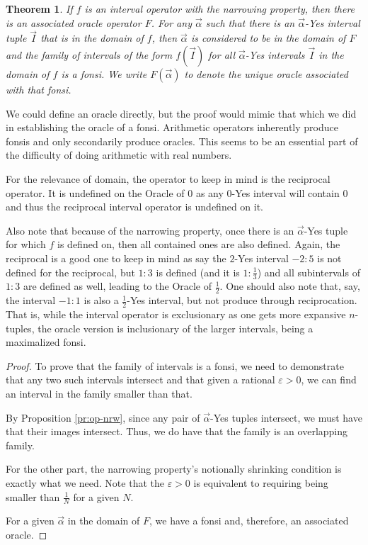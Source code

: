 \documentclass[12pt]{article}
\newtheorem{theorem}{Theorem}[subsection]
\begin{document}
\begin{theorem}\label{th:intop}
If $f$ is an interval operator with the narrowing property, then there is an associated oracle operator $F$. For any $\vec{\alpha}$ such that there is an $\vec{\alpha}$-Yes interval tuple $\vec{I}$ that is in the domain of 
$f$, then $\vec{\alpha}$ is considered to be in the domain of $F$ and the family of intervals of the form $f(\vec{I})$ for all $\vec{\alpha}$-Yes intervals $\vec{I}$ in the domain of $f$ is a fonsi. We write $F(\vec{\alpha})$ to denote the unique oracle associated with that fonsi. 
\end{theorem}

We could define an oracle directly, but the proof would mimic that which we did in establishing the oracle of a fonsi. Arithmetic operators inherently produce fonsis and only secondarily produce oracles. This seems to be an essential part of the difficulty of doing arithmetic with real numbers. 

For the relevance of domain, the operator to keep in mind is the reciprocal operator. It is undefined on the Oracle of 0 as any 0-Yes interval will contain 0 and thus the reciprocal interval operator is undefined on it. 

Also note that because of the narrowing property, once there is an $\vec{\alpha}$-Yes tuple for which $f$ is defined on, then all contained ones are also defined. Again, the reciprocal is a good one to keep in mind as say the $2$-Yes interval $-2:5$ is not defined for the reciprocal, but $1:3$ is defined (and it is $1:\frac{1}{3}$) and all subintervals of $1:3$ are defined as well, leading to the Oracle of $\frac{1}{2}$. One should also note that, say, the interval $-1:1$ is also a $\frac{1}{2}$-Yes interval, but not produce through reciprocation. That is, while the interval operator is exclusionary as one gets more expansive $n$-tuples, the oracle version is inclusionary of the larger intervals, being a maximalized fonsi. 

\begin{proof}
To prove that the family of intervals is a fonsi, we need to demonstrate that any two such intervals intersect and that given a rational $\varepsilon > 0$, we can find an interval in the family smaller than that. 

By Proposition \ref{pr:op-nrw}, since any pair of $\vec{\alpha}$-Yes tuples intersect, we must have that their images intersect. Thus, we do have that the family is an overlapping family. 

For the other part, the narrowing property's notionally shrinking condition is exactly what we need. Note that the $\varepsilon > 0$ is equivalent to requiring being smaller than $\frac{1}{N}$ for a given $N$.

For a given $\vec{\alpha}$ in the domain of $F$, we have a fonsi and, therefore, an associated oracle.
\end{proof}
\end{document}

